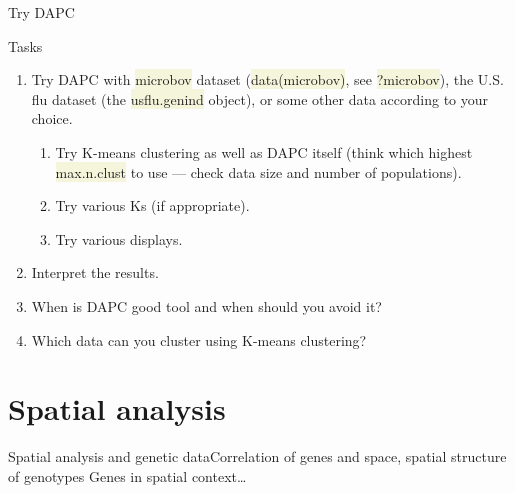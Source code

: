 \documentclass[compress, xelatex, 11pt, xcolor=svgnames, aspectratio=169, url={hyphens, lowtilde}]{beamer}
\renewcommand{\texttt}[1]{\colorbox{Beige}{{\ttfamily #1}}}
\begin{document}
\begin{frame}{Try DAPC}
	\begin{exampleblock}{Tasks}
		\begin{enumerate}
			\item Try DAPC with \texttt{microbov} dataset (\texttt{data(microbov)}, see \texttt{?microbov}), the U.S. flu dataset (the \texttt{usflu.genind} object), or some other data according to your choice.
			\begin{enumerate}
				\item Try K-means clustering as well as DAPC itself (think which highest \texttt{max.n.clust} to use --- check data size and number of populations).
				\item Try various Ks (if appropriate).
				\item Try various displays.
			\end{enumerate}
			\item Interpret the results.
			\item When is DAPC good tool and when should you avoid it?
			\item Which data can you cluster using K-means clustering?
		\end{enumerate}
	\end{exampleblock}
\end{frame}

\section{Spatial analysis}

\begin{frame}[fragile]{Spatial analysis and genetic data}{Correlation of genes and space, spatial structure of genotypes}
	Genes in spatial context\ldots
	\tableofcontents[currentsection, sectionstyle=show/hide, hideothersubsections]
\end{frame}
\end{document}
